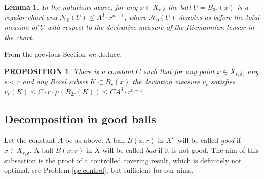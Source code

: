 \documentclass[12pt,leqno]{amsart}
\numberwithin{equation}{section}
\newtheorem{lem}[thm]{Lemma}
\newtheorem{prop}[thm]{PROPOSITION}
\theoremstyle{definition}
\theoremstyle{remark}
\def\RR{\mathbb R}
\def\eps{\varepsilon}
\begin{document}
\begin{lem}
In the notations above, for any $x\in X_{r,\delta}$  the ball $U=B_{3r} (x)$ is a regular chart and
 $\mathcal N_0 (U) \leq A^3 \cdot r^{n-1}$, where $\mathcal N_0 (U)$ denotes as before the total measure of $U$ with respect to the derivative measure of the Riemannian tensor in the chart.\end{lem}








From the previous Section we deduce:


 \begin{prop}  \label{ballmeasure}
 There is a constant $C$ such that for any point $x\in X_{r,\delta}$, any $s<r$ and any
 Borel subset $K\subset B_r (x)$ the deviation measure $v_r $ satisfies
  $v_r (K) \leq C \cdot r\cdot \mu  ( B_{2r} (K)) \leq CA^3 \cdot r^{n-1} $.
 \end{prop}





\subsection{Decomposition in good balls}
Let the constant  $A$ be as above.
A ball $B(x,r)$ in $X^n$ will be called \emph{good} if $x\in X_{r,\delta}$.
%
A ball $B(x,r)$ in $X$ will be called \emph{bad} if it is not good.
The aim of this subsection is the proof of a controlled covering result, which is definitely not optimal, see Problem \ref{qe:control}, but sufficient for our
aims.
\end{document}
